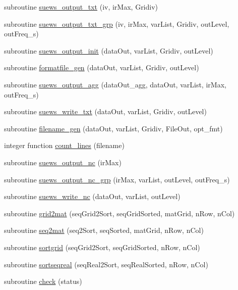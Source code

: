 \begin{DoxyCompactItemize}
\item 
subroutine \hyperlink{namespacectrl__output_a33e3b788edad27be3211458c4388f8e5}{suews\+\_\+output\+\_\+txt} (iv, ir\+Max, Gridiv)
\item 
subroutine \hyperlink{namespacectrl__output_ac3541cbdb88f9028bc3592ee65b64980}{suews\+\_\+output\+\_\+txt\+\_\+grp} (iv, ir\+Max, var\+List, Gridiv, out\+Level, out\+Freq\+\_\+s)
\item 
subroutine \hyperlink{namespacectrl__output_aa089b1e6d88c1556fb0d0f645face272}{suews\+\_\+output\+\_\+init} (data\+Out, var\+List, Gridiv, out\+Level)
\item 
subroutine \hyperlink{namespacectrl__output_a754f1fcb7692b22f531bcbd7fffd2634}{formatfile\+\_\+gen} (data\+Out, var\+List, Gridiv, out\+Level)
\item 
subroutine \hyperlink{namespacectrl__output_ae9a62c39f1b7598a639718dd95127977}{suews\+\_\+output\+\_\+agg} (data\+Out\+\_\+agg, data\+Out, var\+List, ir\+Max, out\+Freq\+\_\+s)
\item 
subroutine \hyperlink{namespacectrl__output_a84e30d3564e406535ea078c470a62668}{suews\+\_\+write\+\_\+txt} (data\+Out, var\+List, Gridiv, out\+Level)
\item 
subroutine \hyperlink{namespacectrl__output_a01d8b0b36afd96d4fe5ff45436e13782}{filename\+\_\+gen} (data\+Out, var\+List, Gridiv, File\+Out, opt\+\_\+fmt)
\item 
integer function \hyperlink{namespacectrl__output_ad7bc76aa43873e663835c8d008f7d548}{count\+\_\+lines} (filename)
\item 
subroutine \hyperlink{namespacectrl__output_abe2b9152111665466982f35349bf24d8}{suews\+\_\+output\+\_\+nc} (ir\+Max)
\item 
subroutine \hyperlink{namespacectrl__output_a333bec5a308bd89762292b7f695bdb9b}{suews\+\_\+output\+\_\+nc\+\_\+grp} (ir\+Max, var\+List, out\+Level, out\+Freq\+\_\+s)
\item 
subroutine \hyperlink{namespacectrl__output_a34f8d939c96cb60cdf1f9739e1ea4672}{suews\+\_\+write\+\_\+nc} (data\+Out, var\+List, out\+Level)
\item 
subroutine \hyperlink{namespacectrl__output_a7c804abccd932d50e4938262f22f586e}{grid2mat} (seq\+Grid2\+Sort, seq\+Grid\+Sorted, mat\+Grid, n\+Row, n\+Col)
\item 
subroutine \hyperlink{namespacectrl__output_a06abc3039b8c610cb65b9cd42817d064}{seq2mat} (seq2\+Sort, seq\+Sorted, mat\+Grid, n\+Row, n\+Col)
\item 
subroutine \hyperlink{namespacectrl__output_a1807dd1d886e5fd090461e140156758b}{sortgrid} (seq\+Grid2\+Sort, seq\+Grid\+Sorted, n\+Row, n\+Col)
\item 
subroutine \hyperlink{namespacectrl__output_a093211a59ed2a27d1d853afc548146df}{sortseqreal} (seq\+Real2\+Sort, seq\+Real\+Sorted, n\+Row, n\+Col)
\item 
subroutine \hyperlink{namespacectrl__output_a0fbef481d73d1ca11f59121aadf9cb87}{check} (status)
\end{DoxyCompactItemize}
